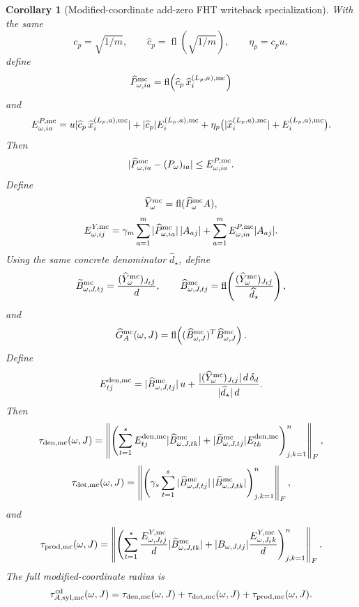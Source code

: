\documentclass[11pt]{article}
\newcommand{\fl}{\operatorname{fl}}
\newtheorem{corollary}[theorem]{Corollary}
\theoremstyle{remark}
\begin{document}
\begin{corollary}[Modified-coordinate add-zero FHT writeback specialization]
With the same
\[
  c_p=\sqrt{1/m},\qquad
  \widehat c_p=\fl(\sqrt{1/m}),\qquad
  \eta_p=c_pu,
\]
define
\[
  \widehat P^{\rm mc}_{\omega,ia}
  =
  \fl\!\left(\widehat c_p\,\widehat x_i^{(L_p,a),\mathrm{mc}}\right)
\]
and
\[
  E^{P,{\rm mc}}_{\omega,ia}
  =
  u|\widehat c_p\,\widehat x_i^{(L_p,a),\mathrm{mc}}|
  +
  |\widehat c_p|E_i^{(L_p,a),\mathrm{mc}}
  +
  \eta_p\bigl(
    |\widehat x_i^{(L_p,a),\mathrm{mc}}|
    +E_i^{(L_p,a),\mathrm{mc}}
  \bigr).
\]
Then
\[
  |\widehat P^{\rm mc}_{\omega,ia}-(P_\omega)_{ia}|
  \le E^{P,{\rm mc}}_{\omega,ia}.
\]
Define
\[
  \widehat Y^{\rm mc}_\omega=\fl(\widehat P^{\rm mc}_\omega A),
\]
\[
  E^{Y,{\rm mc}}_{\omega,ij}
  =
  \gamma_m\sum_{a=1}^m
    |\widehat P^{\rm mc}_{\omega,ia}|\,|A_{aj}|
  +
  \sum_{a=1}^m E^{P,{\rm mc}}_{\omega,ia}|A_{aj}|.
\]
Using the same concrete denominator \(\widehat d_\star\), define
\[
  \widetilde B^{\rm mc}_{\omega,J,tj}
    =
    \frac{(\widehat Y^{\rm mc}_\omega)_{J_tj}}{d},
  \qquad
  \widehat B^{\rm mc}_{\omega,J,tj}
    =
    \fl\!\left(
      \frac{(\widehat Y^{\rm mc}_\omega)_{J_tj}}{\widehat d_\star}
    \right),
\]
and
\[
  \widehat G_A^{\rm mc}(\omega,J)
  =
  \fl\!\left(
    (\widehat B^{\rm mc}_{\omega,J})^T
    \widehat B^{\rm mc}_{\omega,J}
  \right).
\]
Define
\[
  E^{{\rm den},{\rm mc}}_{tj}
  =
  |\widehat B^{\rm mc}_{\omega,J,tj}|\,u
  +
  \frac{|(\widehat Y^{\rm mc}_\omega)_{J_tj}|\,d\,\delta_d}
       {|\widehat d_\star|\,d}.
\]
Then
\[
  \tau_{{\rm den},{\rm mc}}(\omega,J)
  =
  \left\|
    \left(
      \sum_{t=1}^s
      E^{{\rm den},{\rm mc}}_{tj}
        |\widehat B^{\rm mc}_{\omega,J,tk}|
      +
      |\widetilde B^{\rm mc}_{\omega,J,tj}|
        E^{{\rm den},{\rm mc}}_{tk}
    \right)_{j,k=1}^n
  \right\|_F,
\]
\[
  \tau_{{\rm dot},{\rm mc}}(\omega,J)
  =
  \left\|
    \left(
      \gamma_s
      \sum_{t=1}^s
      |\widehat B^{\rm mc}_{\omega,J,tj}|\,
      |\widehat B^{\rm mc}_{\omega,J,tk}|
    \right)_{j,k=1}^n
  \right\|_F,
\]
and
\[
  \tau_{{\rm prod},{\rm mc}}(\omega,J)
  =
  \left\|
    \left(
      \sum_{t=1}^s
      \frac{E^{Y,{\rm mc}}_{\omega,J_tj}}{d}
        |\widetilde B^{\rm mc}_{\omega,J,tk}|
      +
      |B_{\omega,J,tj}|
      \frac{E^{Y,{\rm mc}}_{\omega,J_tk}}{d}
    \right)_{j,k=1}^n
  \right\|_F .
\]
The full modified-coordinate radius is
\[
  \tau_{A,{\rm syl},{\rm mc}}^{\rm cd}(\omega,J)
  =
  \tau_{{\rm den},{\rm mc}}(\omega,J)
  +
  \tau_{{\rm dot},{\rm mc}}(\omega,J)
  +
  \tau_{{\rm prod},{\rm mc}}(\omega,J).
\]


\end{corollary}
\end{document}
